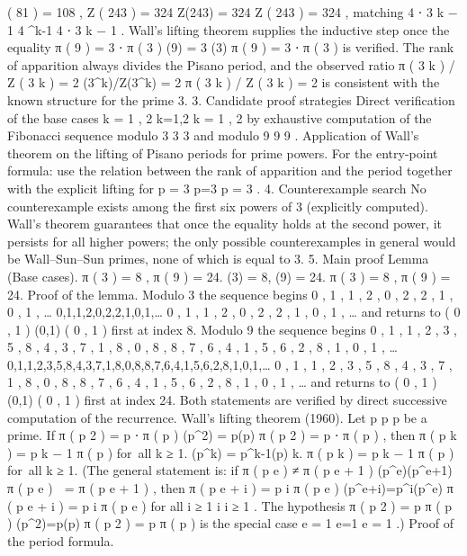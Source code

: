 (
81
)
=
108
,
Z
(
243
)
=
324
Z(243) = 324
Z
(
243
)
=
324
, matching
4
⋅
3
k
−
1
4 ^{k-1}
4
⋅
3
k
−
1
.
Wall’s lifting theorem supplies the inductive step once the equality
π
(
9
)
=
3
⋅
π
(
3
)
\pi(9) = 3 \cdot \pi(3)
π
(
9
)
=
3
⋅
π
(
3
)
is verified.
The rank of apparition always divides the Pisano period, and the observed ratio
π
(
3
k
)
/
Z
(
3
k
)
=
2
\pi(3^k)/Z(3^k) = 2
π
(
3
k
)
/
Z
(
3
k
)
=
2
is consistent with the known structure for the prime 3.
3. Candidate proof strategies
Direct verification of the base cases
k
=
1
,
2
k=1,2
k
=
1
,
2
by exhaustive computation of the Fibonacci sequence modulo
3
3
3
and modulo
9
9
9
.
Application of Wall’s theorem on the lifting of Pisano periods for prime powers.
For the entry-point formula: use the relation between the rank of apparition and the period together with the explicit lifting for
p
=
3
p=3
p
=
3
.
4. Counterexample search
No counterexample exists among the first six powers of 3 (explicitly computed).
Wall’s theorem guarantees that once the equality holds at the second power, it persists for all higher powers; the only possible counterexamples in general would be Wall–Sun–Sun primes, none of which is equal to 3.
5. Main proof
Lemma (Base cases).
π
(
3
)
=
8
,
π
(
9
)
=
24.
\pi(3) = 8, \qquad \pi(9) = 24.
π
(
3
)
=
8
,
π
(
9
)
=
24.
Proof of the lemma.
Modulo 3 the sequence begins
0
,
1
,
1
,
2
,
0
,
2
,
2
,
1
,
0
,
1
,
…
0,1,1,2,0,2,2,1,0,1,\dots
0
,
1
,
1
,
2
,
0
,
2
,
2
,
1
,
0
,
1
,
…
and returns to
(
0
,
1
)
(0,1)
(
0
,
1
)
first at index 8.
Modulo 9 the sequence begins
0
,
1
,
1
,
2
,
3
,
5
,
8
,
4
,
3
,
7
,
1
,
8
,
0
,
8
,
8
,
7
,
6
,
4
,
1
,
5
,
6
,
2
,
8
,
1
,
0
,
1
,
…
0,1,1,2,3,5,8,4,3,7,1,8,0,8,8,7,6,4,1,5,6,2,8,1,0,1,\dots
0
,
1
,
1
,
2
,
3
,
5
,
8
,
4
,
3
,
7
,
1
,
8
,
0
,
8
,
8
,
7
,
6
,
4
,
1
,
5
,
6
,
2
,
8
,
1
,
0
,
1
,
…
and returns to
(
0
,
1
)
(0,1)
(
0
,
1
)
first at index 24. Both statements are verified by direct successive computation of the recurrence.
Wall’s lifting theorem (1960).
Let
p
p
p
be a prime. If
π
(
p
2
)
=
p
⋅
π
(
p
)
\pi(p^2) = p\cdot\pi(p)
π
(
p
2
)
=
p
⋅
π
(
p
)
, then
π
(
p
k
)
=
p
k
−
1
π
(
p
)
for all
k
≥
1.
\pi(p^k) = p^{k-1}\pi(p) \qquad{}k.
π
(
p
k
)
=
p
k
−
1
π
(
p
)
for all
k
≥
1.
(The general statement is: if
π
(
p
e
)
≠
π
(
p
e
+
1
)
\pi(p^e)\ne\pi(p^{e+1})
π
(
p
e
)

=
π
(
p
e
+
1
)
, then
π
(
p
e
+
i
)
=
p
i
π
(
p
e
)
\pi(p^{e+i})=p^i\pi(p^e)
π
(
p
e
+
i
)
=
p
i
π
(
p
e
)
for all
i
≥
1
i
i
≥
1
. The hypothesis
π
(
p
2
)
=
p
π
(
p
)
\pi(p^2)=p\pi(p)
π
(
p
2
)
=
p
π
(
p
)
is the special case
e
=
1
e=1
e
=
1
.)
Proof of the period formula.
